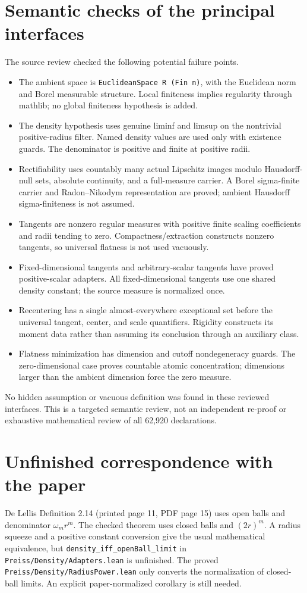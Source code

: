 \section{Semantic checks of the principal interfaces}
The source review checked the following potential failure points.
\begin{itemize}
\item The ambient space is \texttt{EuclideanSpace R (Fin n)}, with the
Euclidean norm and Borel measurable structure. Local finiteness implies
regularity through mathlib; no global finiteness hypothesis is added.
\item The density hypothesis uses genuine liminf and limsup on the nontrivial
positive-radius filter. Named density values are used only with existence
guards. The denominator is positive and finite at positive radii.
\item Rectifiability uses countably many actual Lipschitz images modulo
Hausdorff-null sets, absolute continuity, and a full-measure carrier.
A Borel sigma-finite carrier and Radon--Nikodym representation are proved;
ambient Hausdorff sigma-finiteness is not assumed.
\item Tangents are nonzero regular measures with positive finite scaling
coefficients and radii tending to zero. Compactness/extraction constructs
nonzero tangents, so universal flatness is not used vacuously.
\item Fixed-dimensional tangents and arbitrary-scalar tangents have proved
positive-scalar adapters. All fixed-dimensional tangents use one shared
density constant; the source measure is normalized once.
\item Recentering has a single almost-everywhere exceptional set before the
universal tangent, center, and scale quantifiers. Rigidity constructs its
moment data rather than assuming its conclusion through an auxiliary class.
\item Flatness minimization has dimension and cutoff nondegeneracy guards.
The zero-dimensional case proves countable atomic concentration; dimensions
larger than the ambient dimension force the zero measure.
\end{itemize}
No hidden assumption or vacuous definition was found in these reviewed
interfaces. This is a targeted semantic review, not an independent re-proof
or exhaustive mathematical review of all 62,920 declarations.

\section{Unfinished correspondence with the paper}
De Lellis Definition 2.14 (printed page 11, PDF page 15) uses open balls and
denominator $\omega_m r^m$. The checked theorem uses closed balls and
$(2r)^m$. A radius squeeze and a positive constant conversion give the
usual mathematical equivalence, but
\texttt{density\_iff\_openBall\_limit} in
\texttt{Preiss/Density/Adapters.lean} is unfinished. The proved
\texttt{Preiss/Density/RadiusPower.lean} only converts the normalization of
closed-ball limits. An explicit paper-normalized corollary is still needed.

